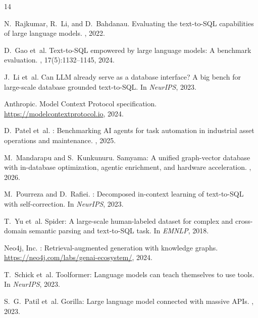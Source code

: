 \documentclass[sigconf]{acmart}
\begin{document}

\begin{thebibliography}{14}

N.~Rajkumar, R.~Li, and D.~Bahdanau.
\newblock Evaluating the text-to-SQL capabilities of large language models.
, 2022.

D.~Gao et~al.
\newblock Text-to-SQL empowered by large language models: A benchmark evaluation.
, 17(5):1132--1145, 2024.

J.~Li et~al.
\newblock Can LLM already serve as a database interface? A big bench for
  large-scale database grounded text-to-SQL.
\newblock In {\em NeurIPS}, 2023.

Anthropic.
\newblock Model {Context Protocol} specification.
\newblock \url{https://modelcontextprotocol.io}, 2024.

D.~Patel et~al.
: Benchmarking {AI} agents for task automation in
  industrial asset operations and maintenance.
, 2025.

M.~Mandarapu and S.~Kunkunuru.
\newblock Samyama: A unified graph-vector database with in-database optimization,
  agentic enrichment, and hardware acceleration.
, 2026.

M.~Pourreza and D.~Rafiei.
: Decomposed in-context learning of text-to-SQL with
  self-correction.
\newblock In {\em NeurIPS}, 2023.

T.~Yu et~al.
\newblock Spider: A large-scale human-labeled dataset for complex and
  cross-domain semantic parsing and text-to-SQL task.
\newblock In {\em EMNLP}, 2018.

Neo4j, Inc.
: Retrieval-augmented generation with knowledge graphs.
\newblock \url{https://neo4j.com/labs/genai-ecosystem/}, 2024.

T.~Schick et~al.
\newblock Toolformer: Language models can teach themselves to use tools.
\newblock In {\em NeurIPS}, 2023.

S.~G.~Patil et~al.
\newblock Gorilla: Large language model connected with massive APIs.
, 2023.


\end{thebibliography}
\end{document}
